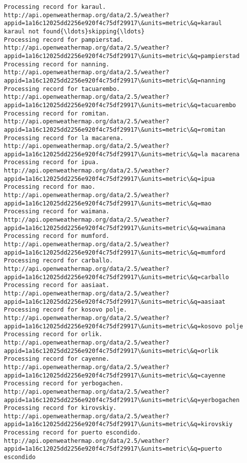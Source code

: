 \documentclass[11pt]{article}
\begin{document}
\begin{Verbatim}[commandchars=\\\{\}]
Processing record for karaul.
http://api.openweathermap.org/data/2.5/weather?appid=1a16c12025dd2256e920f4c75df29917\&units=metric\&q=karaul
karaul not found{\ldots}skipping{\ldots}
Processing record for pampierstad.
http://api.openweathermap.org/data/2.5/weather?appid=1a16c12025dd2256e920f4c75df29917\&units=metric\&q=pampierstad
Processing record for nanning.
http://api.openweathermap.org/data/2.5/weather?appid=1a16c12025dd2256e920f4c75df29917\&units=metric\&q=nanning
Processing record for tacuarembo.
http://api.openweathermap.org/data/2.5/weather?appid=1a16c12025dd2256e920f4c75df29917\&units=metric\&q=tacuarembo
Processing record for romitan.
http://api.openweathermap.org/data/2.5/weather?appid=1a16c12025dd2256e920f4c75df29917\&units=metric\&q=romitan
Processing record for la macarena.
http://api.openweathermap.org/data/2.5/weather?appid=1a16c12025dd2256e920f4c75df29917\&units=metric\&q=la macarena
Processing record for ipua.
http://api.openweathermap.org/data/2.5/weather?appid=1a16c12025dd2256e920f4c75df29917\&units=metric\&q=ipua
Processing record for mao.
http://api.openweathermap.org/data/2.5/weather?appid=1a16c12025dd2256e920f4c75df29917\&units=metric\&q=mao
Processing record for waimana.
http://api.openweathermap.org/data/2.5/weather?appid=1a16c12025dd2256e920f4c75df29917\&units=metric\&q=waimana
Processing record for mumford.
http://api.openweathermap.org/data/2.5/weather?appid=1a16c12025dd2256e920f4c75df29917\&units=metric\&q=mumford
Processing record for carballo.
http://api.openweathermap.org/data/2.5/weather?appid=1a16c12025dd2256e920f4c75df29917\&units=metric\&q=carballo
Processing record for aasiaat.
http://api.openweathermap.org/data/2.5/weather?appid=1a16c12025dd2256e920f4c75df29917\&units=metric\&q=aasiaat
Processing record for kosovo polje.
http://api.openweathermap.org/data/2.5/weather?appid=1a16c12025dd2256e920f4c75df29917\&units=metric\&q=kosovo polje
Processing record for orlik.
http://api.openweathermap.org/data/2.5/weather?appid=1a16c12025dd2256e920f4c75df29917\&units=metric\&q=orlik
Processing record for cayenne.
http://api.openweathermap.org/data/2.5/weather?appid=1a16c12025dd2256e920f4c75df29917\&units=metric\&q=cayenne
Processing record for yerbogachen.
http://api.openweathermap.org/data/2.5/weather?appid=1a16c12025dd2256e920f4c75df29917\&units=metric\&q=yerbogachen
Processing record for kirovskiy.
http://api.openweathermap.org/data/2.5/weather?appid=1a16c12025dd2256e920f4c75df29917\&units=metric\&q=kirovskiy
Processing record for puerto escondido.
http://api.openweathermap.org/data/2.5/weather?appid=1a16c12025dd2256e920f4c75df29917\&units=metric\&q=puerto escondido

\end{Verbatim}
\end{document}
